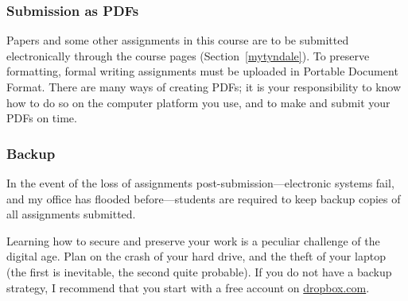 \subsubsection{Submission as PDFs}
\label{submission}

Papers and some other assignments in this course are to be submitted
electronically through the course pages (Section~\ref{mytyndale}). To preserve
formatting, formal writing assignments must be uploaded in Portable Document
Format. There are many ways of creating PDFs; it is your responsibility to know
how to do so on the computer platform you use, and to make and submit your PDFs
on time.

\subsubsection{Backup}
\label{backup}

In the event of the loss of assignments post-submission---electronic systems
fail, and my office has flooded before---students are required to keep backup
copies of all assignments submitted.

Learning how to secure and preserve your work is a peculiar challenge of the
digital age. Plan on the crash of your hard drive, and the theft of your
laptop (the first is inevitable, the second quite probable). If you do not
have a backup strategy, I recommend that you start with a free account on
\href{http://db.tt/U7eP1vs}{dropbox.com}.
